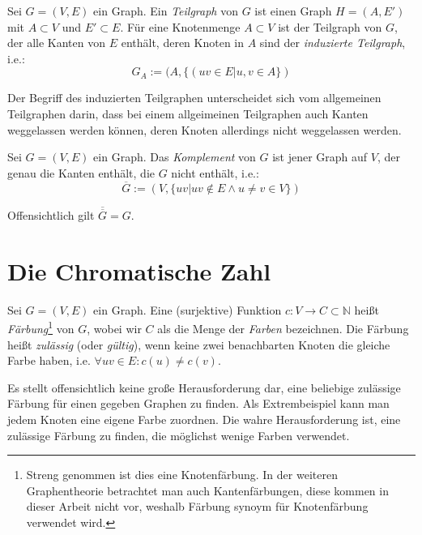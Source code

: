 \documentclass[../main.tex]{subfiles}
\begin{document}
\begin{definition}
    Sei $G = (V, E)$ ein Graph. Ein \emph{Teilgraph} von $G$ ist einen Graph $H = (A, E')$ mit $A \subset V$ und $E' \subset E$. Für eine Knotenmenge $A \subset V$ ist der Teilgraph von $G$, der alle Kanten von $E$ enthält, deren Knoten in $A$ sind der \emph{induzierte Teilgraph}, i.e.:
    \begin{equation*}
        G_A := (A, \{(uv \in E | u, v \in A\})
    \end{equation*}
\end{definition}

Der Begriff des induzierten Teilgraphen unterscheidet sich vom allgemeinen Teilgraphen darin, dass bei einem allgeimeinen Teilgraphen auch Kanten weggelassen werden können, deren Knoten allerdings nicht weggelassen werden.

\begin{definition}
    Sei $G = (V, E)$ ein Graph. Das \emph{Komplement} von $G$ ist jener Graph auf $V$, der genau die Kanten enthält, die $G$ nicht enthält, i.e.:
    \begin{equation*}
        \overline G := (V, \{uv | uv \notin E \wedge u \neq v \in V\})
    \end{equation*}
\end{definition}

Offensichtlich gilt $\overline{\overline G} = G$.

\section{Die Chromatische Zahl}

\begin{definition}
    Sei $G = (V, E)$ ein Graph. Eine (surjektive) Funktion $c: V \to C \subset \mathbb N$ heißt \emph{Färbung}\footnote{Streng genommen ist dies eine Knotenfärbung. In der weiteren Graphentheorie betrachtet man auch Kantenfärbungen, diese kommen in dieser Arbeit nicht vor, weshalb Färbung synoym für Knotenfärbung verwendet wird.} von $G$, wobei wir $C$ als die Menge der \emph{Farben} bezeichnen. Die Färbung heißt \emph{zulässig} (oder \emph{gültig}), wenn keine zwei benachbarten Knoten die gleiche Farbe haben, i.e. $\forall uv \in E: c(u) \neq c(v)$.
\end{definition}

Es stellt offensichtlich keine große Herausforderung dar, eine beliebige zulässige Färbung für einen gegeben Graphen zu finden. Als Extrembeispiel kann man jedem Knoten eine eigene Farbe zuordnen. Die wahre Herausforderung ist, eine zulässige Färbung zu finden, die möglichst wenige Farben verwendet.
\end{document}

